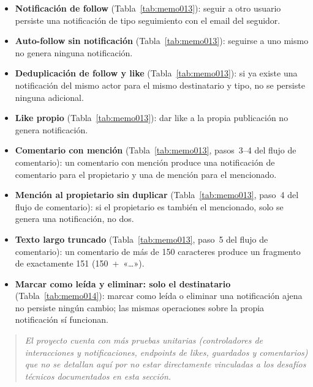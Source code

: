 \begin{itemize}
    \item \textbf{Notificación de follow} (Tabla~\ref{tab:memo013}): seguir a otro usuario persiste una notificación de tipo seguimiento con el email del seguidor.

    \item \textbf{Auto-follow sin notificación} (Tabla~\ref{tab:memo013}): seguirse a uno mismo no genera ninguna notificación.

    \item \textbf{Deduplicación de follow y like} (Tabla~\ref{tab:memo013}): si ya existe una notificación del mismo actor para el mismo destinatario y tipo, no se persiste ninguna adicional.

    \item \textbf{Like propio} (Tabla~\ref{tab:memo013}): dar like a la propia publicación no genera notificación.

    \item \textbf{Comentario con mención} (Tabla~\ref{tab:memo013}, pasos~3--4 del flujo de comentario): un comentario con mención produce una notificación de comentario para el propietario y una de mención para el mencionado.

    \item \textbf{Mención al propietario sin duplicar} (Tabla~\ref{tab:memo013}, paso~4 del flujo de comentario): si el propietario es también el mencionado, solo se genera una notificación, no dos.

    \item \textbf{Texto largo truncado} (Tabla~\ref{tab:memo013}, paso~5 del flujo de comentario): un comentario de más de 150 caracteres produce un fragmento de exactamente 151 (150~+~«\ldots»).

    \item \textbf{Marcar como leída y eliminar: solo el destinatario} (Tabla~\ref{tab:memo014}): marcar como leída o eliminar una notificación ajena no persiste ningún cambio; las mismas operaciones sobre la propia notificación sí funcionan.
\end{itemize}

\begin{quote}
\small\textit{El proyecto cuenta con más pruebas unitarias (controladores de interacciones y notificaciones, endpoints de likes, guardados y comentarios) que no se detallan aquí por no estar directamente vinculadas a los desafíos técnicos documentados en esta sección.}
\end{quote}

